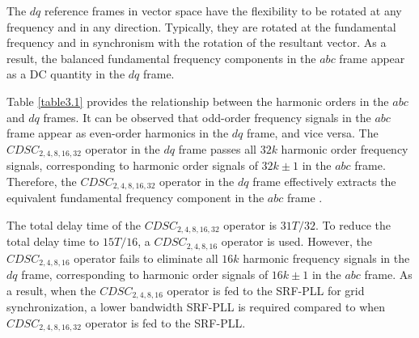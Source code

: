 The $dq$ reference frames in vector space have the flexibility to be rotated at any frequency and in any direction. Typically, they are rotated at the fundamental frequency and in synchronism with the rotation of the resultant vector. As a result, the balanced fundamental frequency components in the $abc$ frame appear as a DC quantity in the $dq$ frame.

Table \ref{table3.1} provides the relationship between the harmonic orders in the $abc$ and $dq$ frames. It can be observed that odd-order frequency signals in the $abc$ frame appear as even-order harmonics in the $dq$ frame, and vice versa. The $CDSC_{2,4,8,16,32}$ operator in the $dq$ frame passes all $32k$ harmonic order frequency signals, corresponding to harmonic order signals of $32k\pm1$ in the $abc$ frame. Therefore, the $CDSC_{2,4,8,16,32}$ operator in the $dq$ frame effectively extracts the equivalent fundamental frequency component in the $abc$ frame .

The total delay time of the $CDSC_{2,4,8,16,32}$ operator is $31T/32$. To reduce the total delay time to $15T/16$, a $CDSC_{2,4,8,16}$ operator is used. However, the $CDSC_{2,4,8,16}$ operator fails to eliminate all $16k$ harmonic frequency signals in the $dq$ frame, corresponding to harmonic order signals of $16k\pm1$ in the $abc$ frame. As a result, when the $CDSC_{2,4,8,16}$ operator is fed to the SRF-PLL for grid synchronization, a lower bandwidth SRF-PLL is required compared to when $CDSC_{2,4,8,16,32}$ operator is fed to the SRF-PLL.

